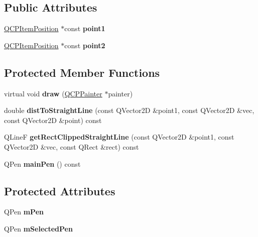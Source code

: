 \subsection*{Public Attributes}
\begin{DoxyCompactItemize}
\item 
\mbox{\label{class_q_c_p_item_straight_line_ac131a6ffe456f2cc7364dce541fe0120}} 
\mbox{\hyperlink{class_q_c_p_item_position}{Q\+C\+P\+Item\+Position}} $\ast$const {\bfseries point1}
\item 
\mbox{\label{class_q_c_p_item_straight_line_ad26c0a732e471f63f75d481dcd48cfc9}} 
\mbox{\hyperlink{class_q_c_p_item_position}{Q\+C\+P\+Item\+Position}} $\ast$const {\bfseries point2}
\end{DoxyCompactItemize}
\subsection*{Protected Member Functions}
\begin{DoxyCompactItemize}
\item 
\mbox{\label{class_q_c_p_item_straight_line_a2daa1e1253216c26565d56a2d5530170}} 
virtual void {\bfseries draw} (\mbox{\hyperlink{class_q_c_p_painter}{Q\+C\+P\+Painter}} $\ast$painter)
\item 
\mbox{\label{class_q_c_p_item_straight_line_a17107170ed03722e6d626a3ff5a8491c}} 
double {\bfseries dist\+To\+Straight\+Line} (const Q\+Vector2D \&point1, const Q\+Vector2D \&vec, const Q\+Vector2D \&point) const
\item 
\mbox{\label{class_q_c_p_item_straight_line_af0c893b7196ba210555a8f4332707eab}} 
Q\+LineF {\bfseries get\+Rect\+Clipped\+Straight\+Line} (const Q\+Vector2D \&point1, const Q\+Vector2D \&vec, const Q\+Rect \&rect) const
\item 
\mbox{\label{class_q_c_p_item_straight_line_a5b1a39cfc54c3e22f65de2958d40eb59}} 
Q\+Pen {\bfseries main\+Pen} () const
\end{DoxyCompactItemize}
\subsection*{Protected Attributes}
\begin{DoxyCompactItemize}
\item 
\mbox{\label{class_q_c_p_item_straight_line_a15106ddc2ebd73ed5c1bc57aa92bee8f}} 
Q\+Pen {\bfseries m\+Pen}
\item 
\mbox{\label{class_q_c_p_item_straight_line_a0307a0d56a018656adbf798bc84c2a4b}} 
Q\+Pen {\bfseries m\+Selected\+Pen}
\end{DoxyCompactItemize}

